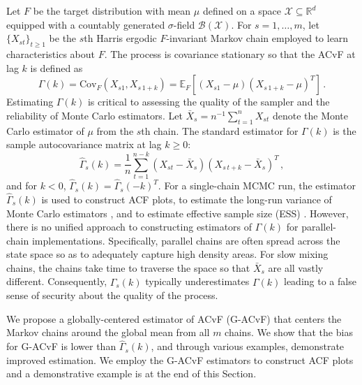 \documentclass[11pt]{article}
\newcommand{\Cov}{\text{Cov}}
\newcommand{\X}{\mathcal{X}}
\theoremstyle{remark}
\begin{document}
Let $F$ be the target distribution with mean $\mu$ defined on a space $\X \subseteq \mathbb{R}^d$ equipped with a countably generated $\sigma$-field $\mathcal{B}(\X)$. For $s = 1, \dots, m$, let $\{X_{st}\}_{t\geq1}$ be the $s${th} Harris ergodic $F$-invariant Markov chain \citep[see][for definitions]{meyn:twee:2009} employed to learn characteristics about $F$. The process is covariance stationary so that
the ACvF at lag $k$ is defined as 
%
\[
    \Gamma(k) = \Cov_F(X_{s1}, X_{s\,1+k})= \mathbb{E}_F \left[(X_{s1} - \mu)(X_{s\,1+k} - \mu)^T \right]\,.
\]
Estimating $\Gamma(k)$ is critical to assessing the quality of the sampler and the reliability of Monte Carlo estimators. Let $\bar{X}_s = n^{-1} \sum_{t=1}^{n} X_{st}$ denote the Monte Carlo estimator of $\mu$ from the $s$th chain. The standard estimator for $\Gamma(k)$ is the sample autocovariance matrix at lag $k \geq 0$:
%
\begin{equation} \label{eq:empirical_ACvF}
    \hat{\Gamma}_s(k) = \dfrac{1}{n}\sum_{t=1}^{n-k} \left(X_{st} - \bar{X}_s \right) \left(X_{s\, t + k} - \bar{X}_s \right)^T\,,
\end{equation}
and for $k < 0$, $\hat{\Gamma}_s(k) = \hat{\Gamma}_s(-k)^T$. For a single-chain MCMC run, the estimator $\hat{\Gamma}_s(k)$ is used to construct ACF plots, to estimate the long-run variance of Monte Carlo estimators \citep{hannan:1970,dame:1991}, and to estimate effective sample size (ESS) \citep{kass:carlin:gelman:neal:1998,gong:fleg:2016,vats:fleg:jon:2019}. However, there is no unified approach to constructing estimators of $\Gamma(k)$ for parallel-chain implementations. Specifically, parallel chains are often spread across the state space so as to adequately capture high density areas. For slow mixing chains, the chains take time to traverse the space so that $\bar{X}_s$  are all vastly different. Consequently, $\hat{\Gamma}_s(k)$ typically underestimates $\Gamma(k)$ leading to a false sense of security about the quality of the process.


 We propose a globally-centered estimator of ACvF (G-ACvF) that centers the Markov chains around the global mean from all $m$ chains. We show that the bias for G-ACvF is lower than $\hat{\Gamma}_s(k)$, and through various examples, demonstrate improved estimation. We employ the G-ACvF estimators to construct ACF plots and a demonstrative example is at the end of this Section. 


 
\end{document}
